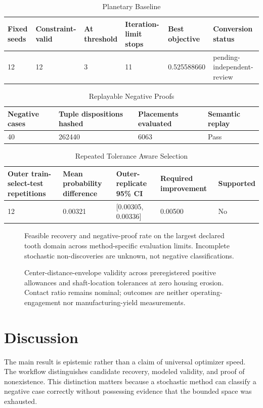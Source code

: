 \documentclass[preprint,12pt]{elsarticle}
\begin{document}
\begin{table}[htbp]
\centering
\caption{Planetary Baseline}
\small
\begin{tabular}{llllll}
\textbf{Fixed seeds} & \textbf{Constraint-valid} & \textbf{At threshold} & \textbf{Iteration-limit stops} & \textbf{Best objective} & \textbf{Conversion status} \\
\hline
12 & 12 & 3 & 11 & 0.525588660 & pending-independent-review \\
\end{tabular}
\end{table}
\begin{table}[htbp]
\centering
\caption{Replayable Negative Proofs}
\small
\begin{tabular}{llll}
\textbf{Negative cases} & \textbf{Tuple dispositions hashed} & \textbf{Placements evaluated} & \textbf{Semantic replay} \\
\hline
40 & 262440 & 6063 & Pass \\
\end{tabular}
\end{table}
\begin{table}[htbp]
\centering
\caption{Repeated Tolerance Aware Selection}
\small
\begin{tabular}{lllll}
\textbf{Outer train-select-test repetitions} & \textbf{Mean probability difference} & \textbf{Outer-replicate 95\% CI} & \textbf{Required improvement} & \textbf{Supported} \\
\hline
12 & 0.00321 & [0.00305, 0.00336] & 0.00500 & No \\
\end{tabular}
\end{table}
\begin{figure}[htbp]
\centering

\caption{Feasible recovery and negative-proof rate on the largest declared tooth domain across method-specific evaluation limits. Incomplete stochastic non-discoveries are unknown, not negative classifications.}
\end{figure}
\begin{figure}[htbp]
\centering

\caption{Center-distance-envelope validity across preregistered positive allowances and shaft-location tolerances at zero housing erosion. Contact ratio remains nominal; outcomes are neither operating-engagement nor manufacturing-yield measurements.}
\end{figure}
\section{Discussion}
The main result is epistemic rather than a claim of universal optimizer speed. The workflow distinguishes candidate recovery, modeled validity, and proof of nonexistence. This distinction matters because a stochastic method can classify a negative case correctly without possessing evidence that the bounded space was exhausted.
\end{document}
